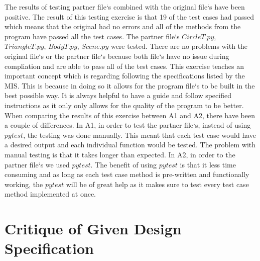 \documentclass[12pt]{article}
\begin{document}
The results of testing partner file`s combined with the original file`s have been positive. The result of this testing exercise is that 19 of the test cases
had passed which means that the original had no errors and all of the methods from the program have passed all the test cases. The partner file`s
$CircleT.py$, $TriangleT.py$, $BodyT.py$, $Scene.py$ were tested. There are no problems with the original file`s or the partner file`s because both file`s
have no issue during compliation and are able to pass all of the test cases. This exercise teaches an important concept which is regarding following the
specifications listed by the MIS. This is because in doing so it allows for the program file`s to be built in the best possible way. It is always helpful
to have a guide and follow specified instructions as it only only allows for the quality of the program to be better. When comparing the results of this
exercise between A1 and A2, there have been a couple of differences. In A1, in order to test the partner file`s, instead of using $pytest$, the testing
was done manually. This meant that each test case would have a desired output and each individual function would be tested. The problem with manual testing
is that it takes longer than expected. In A2, in order to the partner file`s we used $pytest$. The benefit of using $pytest$ is that it less time consuming
and as long as each test case method is pre-written and functionally working, the $pytest$ will be of great help as it makes sure to test every test case
method implemented at once.

\section{Critique of Given Design Specification}
\end{document}
